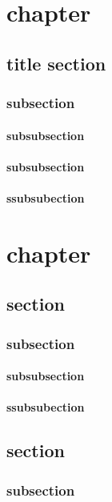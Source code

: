\documentclass[a4paper,11pt]{book}
\begin{document}
    \tableofcontents

    \chapter{chapter}
    \section{title section}
    \subsection{subsection}
    \subsubsection{subsubsection}
    \subsubsection{subsubsection}
    \subsubsection{ssubsubection}

    \chapter{chapter}
    \section{section}
    \subsection{subsection}
    \subsubsection{subsubsection}
    \subsubsection{ssubsubection}
    \section{section}
    \subsection{subsection}
\end{document}
